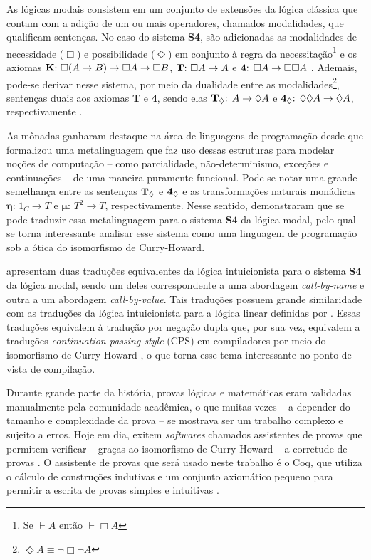 
As lógicas modais consistem em um conjunto de extensões da lógica clássica que contam com a adição de um ou mais operadores, chamados modalidades, que qualificam sentenças. No caso do sistema \textbf{S4}, são adicionadas as modalidades de necessidade ($\Box$) e possibilidade ($\Diamond$) em conjunto à regra da necessitação\footnote{Se $\vdash A$ então $\vdash \Box A$} e os axiomas $\text{\textbf{K}: } \Box(A \to B) \to \Box A \to \Box B$, $\text{\textbf{T}: } \Box A \to A$ e $\text{\textbf{4}: } \Box A \to \Box \Box A$ \cite{Troelstra}. Ademais, pode-se derivar nesse sistema, por meio da dualidade entre as modalidades\footnote{$\Diamond A \equiv \neg \Box \neg A $}, sentenças duais aos axiomas \textbf{T} e \textbf{4}, sendo elas $\boldsymbol{\text{\textbf{T}}_\Diamond \text{: }} A \to \Diamond A$ e $\boldsymbol{\text{\textbf{4}}_\Diamond \text{: }} \Diamond \Diamond A \to \Diamond A$, respectivamente \cite{Zach}.

As mônadas ganharam destaque na área de linguagens de programação desde que \cite{Moggi1991} formalizou uma metalinguagem que faz uso dessas estruturas para modelar noções de computação -- como parcialidade, não-determinismo, exceções e continuações -- de uma maneira puramente funcional. Pode-se notar uma grande semelhança entre as sentenças $\boldsymbol{\text{\textbf{T}}_\Diamond}$ e $\boldsymbol{\text{\textbf{4}}_\Diamond}$ e as transformações naturais monádicas $\boldsymbol{\eta \text{: }} 1_C \to T$ e $\boldsymbol{\mu \text{: }} T^2 \to T$, respectivamente. Nesse sentido, \cite{Pfenning2001} demonstraram que se pode traduzir essa metalinguagem para o sistema \textbf{S4} da lógica modal, pelo qual se torna interessante analisar esse sistema como uma linguagem de programação sob a ótica do isomorfismo de Curry-Howard.

\cite{Troelstra} apresentam duas traduções equivalentes da lógica intuicionista para o sistema \textbf{S4} da lógica modal, sendo um deles correspondente a uma abordagem \textit{call-by-name} e outra a um abordagem \textit{call-by-value}. Tais traduções possuem grande similaridade com as traduções da lógica intuicionista para a lógica linear definidas por \cite{Girard1987}. Essas traduções equivalem à tradução por negação dupla que, por sua vez, equivalem a traduções \textit{continuation-passing style} (CPS) em compiladores por meio do isomorfismo de Curry-Howard \cite{Reynolds}, o que torna esse tema interessante no ponto de vista de compilação.

Durante grande parte da história, provas lógicas e matemáticas eram validadas manualmente pela comunidade acadêmica, o que muitas vezes -- a depender do tamanho e complexidade da prova -- se mostrava ser um trabalho complexo e sujeito a erros. Hoje em dia, exitem \textit{softwares} chamados assistentes de provas que permitem verificar -- graças ao isomorfismo de Curry-Howard -- a corretude de provas \cite{Chlipala}. O assistente de provas que será usado neste trabalho é o Coq, que utiliza o cálculo de construções indutivas e um conjunto axiomático pequeno para permitir a escrita de provas simples e intuitivas \cite{Barras}.

